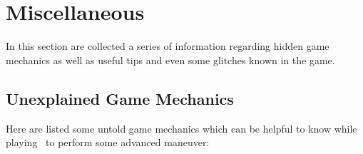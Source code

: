 \section{Miscellaneous}\label{X1:misc} %
In this section are collected a series of information regarding hidden game mechanics as well as useful tips and even some glitches known in the game.

\subsection{Unexplained Game Mechanics}\label{X1:game_mechanics}
Here are listed some untold game mechanics which can be helpful to know while playing~\cite{RTA_wiki:X1} to perform some advanced maneuver: 
